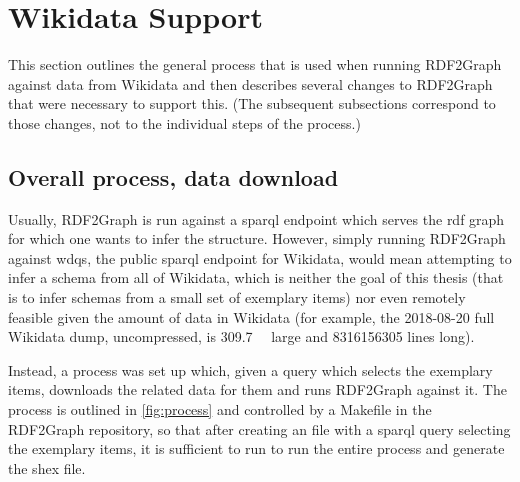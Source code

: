 \section{Wikidata Support}
\label{sec:RDF2Graph+Wikidata:Wikidata}

This section outlines the general process that is used when running \gls{RDF2Graph} against data from \gls{Wikidata}
and then describes several changes to \gls{RDF2Graph} that were necessary to support this.
(The subsequent subsections correspond to those changes, not to the individual steps of the process.)

\subsection{Overall process, data download}
\label{subsec:RDF2Graph+Wikidata:Wikidata:download}

Usually, \gls{RDF2Graph} is run against a \gls{sparql} endpoint
which serves the \gls{rdf} graph for which one wants to infer the structure.
However, simply running \gls{RDF2Graph} against \acrfull{wdqs}, the public \gls{sparql} endpoint for \gls{Wikidata},
would mean attempting to infer a \gls{schema} from all of \gls{Wikidata},
which is neither the goal of this thesis
(that is to infer \glspl{schema} from a small set of exemplary \glspl{item})
nor even remotely feasible given the amount of data in \gls{Wikidata}
(for example, the 2018-08-20 full \gls{Wikidata} dump, uncompressed,
is \SI{309.7}{\giga\byte} large and \num{8316156305} lines long).

Instead, a process was set up which,
given a query which selects the exemplary \glspl{item},
downloads the related data for them and runs \gls{RDF2Graph} against it.
The process is outlined in \cref{fig:process}
and controlled by a Makefile in the \gls{RDF2Graph} repository,
so that after creating an  file
with a \gls{sparql} query selecting the exemplary items,
it is sufficient to run 
to run the entire process and generate the \gls{shex} file.

